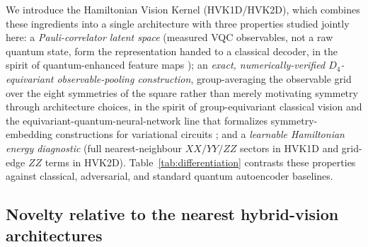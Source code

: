 \documentclass[pdflatex,sn-basic]{sn-jnl}
\begin{document}
We introduce the Hamiltonian Vision Kernel (HVK1D/HVK2D), which combines these
ingredients into a single architecture with three properties studied jointly
here: a \emph{Pauli-correlator latent space} (measured VQC observables, not a raw
quantum state, form the representation handed to a classical decoder, in the
spirit of quantum-enhanced feature maps \citep{Havlicek2019}); an \emph{exact,
numerically-verified $D_4$-equivariant observable-pooling construction},
group-averaging the observable grid over the eight symmetries of the square
rather than merely motivating symmetry through architecture choices, in the
spirit of group-equivariant classical vision \citep{Cohen2016, Bronstein2021}
and the equivariant-quantum-neural-network line that formalizes
symmetry-embedding constructions for variational circuits
\citep{Meyer2023, Nguyen2024EQNN, Schatzki2024, West2024, West2024Erratum}; and a
\emph{learnable Hamiltonian energy diagnostic} (full nearest-neighbour
$XX/YY/ZZ$ sectors in HVK1D and grid-edge $ZZ$ terms in HVK2D).
Table~\ref{tab:differentiation} contrasts these properties against classical,
adversarial, and standard quantum autoencoder baselines.

\subsection*{Novelty relative to the nearest hybrid-vision architectures}
\end{document}
